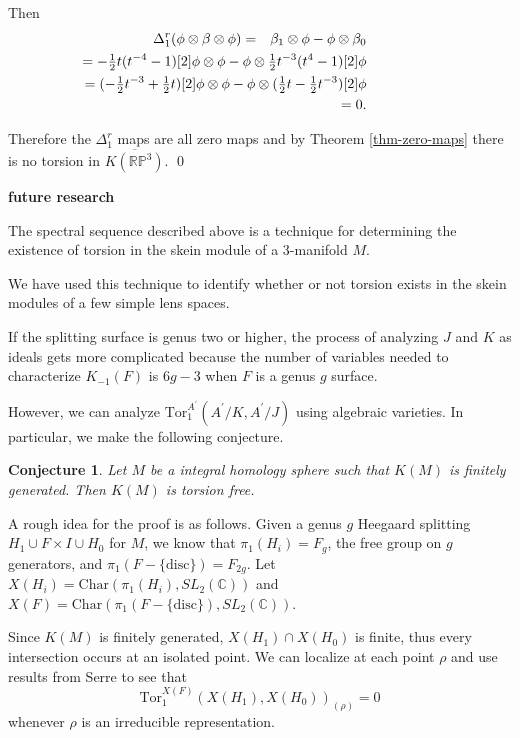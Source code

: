 \documentclass{slides}
\newcommand{\ot}{\otimes}
\newcommand{\slc}{SL_2(\mathbb{C})}
\newcommand{\LittleOneHalf}{{\textstyle \frac{1}{2}}}
\newtheorem{conjecture}{Conjecture}
\theoremstyle{definition}
\begin{document}
\begin{slide}
Then
\begin{eqnarray}
\Delta^r_1( \phi \ot \beta \ot \phi ) & = & \beta_1 \ot \phi - \phi \ot \beta_0 \nonumber \\
& & \hspace{-6cm} = -\LittleOneHalf t (t^{-4} - 1)[2] \phi \ot \phi - \phi \ot \LittleOneHalf t^{-3}(t^{4} -1)[2] \phi
\nonumber \\
& & \hspace{-6cm} =  (- \LittleOneHalf t^{-3} + \LittleOneHalf t)[2] \phi \ot \phi - \phi \ot (\LittleOneHalf t
- \LittleOneHalf t^{-3}) [2] \phi \nonumber \\
& & \hspace{-6cm} = 0. \nonumber
\end{eqnarray}

Therefore the $\Delta^r_1$ maps are all zero maps and by
Theorem \ref{thm-zero-maps} there is no torsion in
$\overline{K(\mathbb{RP}^3)}$.
\qed

\end{slide}

\begin{slide}
\textbf{future research}

The spectral sequence described above is a technique
for determining the existence of torsion in the skein module of a $3$-manifold $M$.

We have used this technique to identify whether or not torsion exists
in the skein modules of a few simple lens spaces.

If the splitting surface is genus two or higher, the process of
analyzing $J$ and $K$ as ideals gets more complicated because the 
number of variables needed to characterize $K_{-1}(F)$ is
$6 g - 3$ when $F$ is a genus $g$ surface.

However, we can analyze $\mathrm{Tor}_1^{A^{\prime}} ( A^{\prime} / K,
A^{\prime} / J )$ using algebraic varieties.  In particular, we make the following
conjecture.
\end{slide}

\begin{slide}
\begin{conjecture}
Let $M$ be a integral homology sphere such that $K(M)$ is
finitely generated.  Then $K(M)$ is torsion free.
\label{conjecture}
\end{conjecture}

A rough idea for the proof is as follows.
Given a genus $g$ Heegaard splitting $H_1 \cup F \times I \cup H_0$ for
$M$, we know that $\pi_1(H_i) = F_g$, the free group on $g$ generators,
and $\pi_1(F - \{ \mathrm{disc} \} ) = F_{2g}$.  Let
$X(H_i) = \mathrm{Char}(\pi_1(H_i), \slc )$ and
$X(F) = \mathrm{Char}(\pi_1(F - \{ \mathrm{disc} \} ), \slc )$.

Since $K(M)$ is finitely generated, $X(H_1) \cap X(H_0)$ is finite, thus
every intersection occurs at an isolated point.  We can localize at each
point $\rho$ and use results from Serre to see that
$$\mathrm{Tor}_1^{X(F)} ( X(H_1), X(H_0))_{(\rho)} = 0$$ whenever
$\rho$ is an irreducible representation.
\end{slide}
\end{document}
